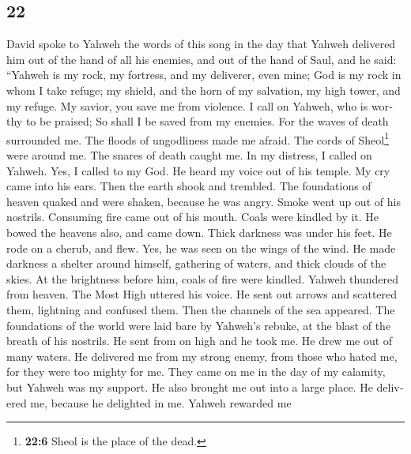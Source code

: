 \begin{paracol}{2}
\switchcolumn
\begin{otherlanguage}{english}

\hypertarget{section-43}{%
\section{22}\label{section-43}}

 David spoke to Yahweh the words of this song in the day
that Yahweh delivered him out of the hand of all his enemies, and out of
the hand of Saul,  and he said: ``Yahweh is my rock, my
fortress, and my deliverer, even mine;  God is my rock in
whom I take refuge; my shield, and the horn of my salvation, my high
tower, and my refuge. My savior, you save me from violence.
 I call on Yahweh, who is worthy to be praised; So shall I
be saved from my enemies.  For the waves of death
surrounded me. The floods of ungodliness made me afraid. 
The cords of Sheol\footnote{\textbf{22:6} Sheol is the place of the
  dead.} were around me. The snares of death caught me. 
In my distress, I called on Yahweh. Yes, I called to my God. He heard my
voice out of his temple. My cry came into his ears.  Then
the earth shook and trembled. The foundations of heaven quaked and were
shaken, because he was angry.  Smoke went up out of his
nostrils. Consuming fire came out of his mouth. Coals were kindled by
it.  He bowed the heavens also, and came down. Thick
darkness was under his feet.  He rode on a cherub, and
flew. Yes, he was seen on the wings of the wind.  He made
darkness a shelter around himself, gathering of waters, and thick clouds
of the skies.  At the brightness before him, coals of
fire were kindled.  Yahweh thundered from heaven. The
Most High uttered his voice.  He sent out arrows and
scattered them, lightning and confused them.  Then the
channels of the sea appeared. The foundations of the world were laid
bare by Yahweh's rebuke, at the blast of the breath of his nostrils.
 He sent from on high and he took me. He drew me out of
many waters.  He delivered me from my strong enemy, from
those who hated me, for they were too mighty for me. 
They came on me in the day of my calamity, but Yahweh was my support.
 He also brought me out into a large place. He delivered
me, because he delighted in me.  Yahweh rewarded me

\end{otherlanguage}
\end{paracol}
